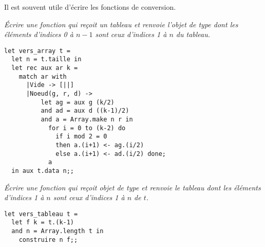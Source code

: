 Il est souvent utile d'écrire les fonctions de conversion.
\begin{Exercise}[title = Tableau vers array]\it 
Écrire une fonction  qui reçoit un tableau et renvoie l'objet de type  dont les éléments d'indices 0 à $n-1$ sont ceux d'indices 1 à $n$ du tableau.
\end{Exercise}
\begin{Answer}
\begin{lstlisting}
let vers_array t =
  let n = t.taille in
  let rec aux ar k =
    match ar with
      |Vide -> [||]
      |Noeud(g, r, d) -> 
          let ag = aux g (k/2)
          and ad = aux d ((k-1)/2) 
          and a = Array.make n r in
            for i = 0 to (k-2) do
              if i mod 2 = 0
              then a.(i+1) <- ag.(i/2)
              else a.(i+1) <- ad.(i/2) done;
            a
  in aux t.data n;;
\end{lstlisting}
\end{Answer}
\begin{Exercise}[title = Array vers tableau]\it 
Écrire une fonction  qui reçoit objet de type  et renvoie le tableau dont les éléments d'indices 1 à $n$ sont ceux d'indices 1 à $n$ de $t$.
\end{Exercise}
\begin{Answer}
\begin{lstlisting}
let vers_tableau t =
  let f k = t.(k-1) 
  and n = Array.length t in
    construire n f;;
\end{lstlisting}
\end{Answer}

